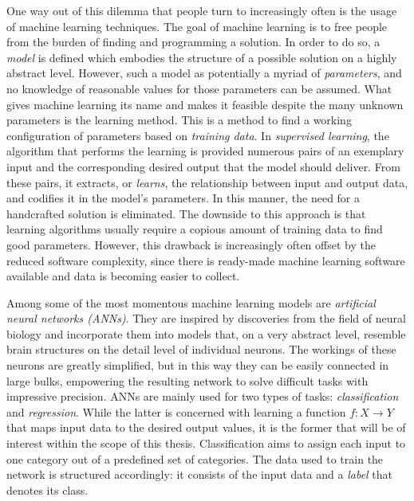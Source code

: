 \documentclass[11pt, a4paper]{article}
\begin{document}
One way out of this dilemma that people turn to increasingly often is the usage of machine learning techniques. The goal of machine learning is to free people from the burden of finding and programming a solution. In order to do so, a \emph{model} is defined which embodies the structure of a possible solution on a highly abstract level. However, such a model as potentially a myriad of \emph{parameters}, and no knowledge of reasonable values for those parameters can be assumed. What gives machine learning its name and makes it feasible despite the many unknown parameters is the learning method. This is a method to find a working configuration of parameters based on \emph{training data}. In \emph{supervised learning}, the algorithm that performs the learning is provided numerous pairs of an exemplary input and the corresponding desired output that the model should deliver. From these pairs, it extracts, or \emph{learns}, the relationship between input and output data, and codifies it in the model's parameters. In this manner, the need for a handcrafted solution is eliminated. The downside to this approach is that learning algorithms usually require a copious amount of training data to find good parameters. However, this drawback is increasingly often offset by the reduced software complexity, since  there is ready-made machine learning software available and data is becoming easier to collect.

Among some of the most momentous machine learning models are \emph{artificial neural networks (ANNs)}. They are inspired by discoveries from the field of neural biology and incorporate them into models that, on a very abstract level, resemble brain structures on the detail level of individual neurons. The workings of these  neurons are greatly simplified, but in this way they can be easily connected in large bulks, empowering the resulting network to solve difficult tasks with impressive precision. ANNs are mainly used for two types of tasks: \emph{classification} and \emph{regression}. While the latter is concerned with learning a function $f: X \rightarrow Y$ that maps input data to the desired output values, it is the former that will be of interest within the scope of this thesis. Classification aims to assign each input to one category out of a predefined set of categories. The data used to train the network is structured accordingly: it consists of the input data and a \emph{label} that denotes its class.
\end{document}
